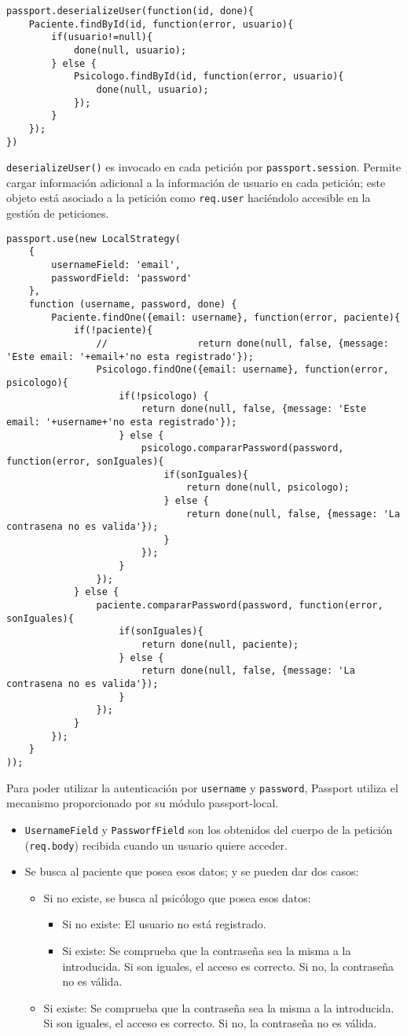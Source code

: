 \medskip
\begin{lstlisting}
passport.deserializeUser(function(id, done){
	Paciente.findById(id, function(error, usuario){
		if(usuario!=null){
			done(null, usuario);
		} else {
			Psicologo.findById(id, function(error, usuario){
				done(null, usuario);
			});
		}
	});
})
\end{lstlisting}

\texttt{deserializeUser()} es invocado en cada petición por \texttt{passport.session}. Permite cargar información adicional a la información de usuario en cada petición; este objeto está asociado a la petición como \texttt{req.user} haciéndolo accesible en la gestión de peticiones.


\medskip
\begin{lstlisting}
passport.use(new LocalStrategy(    
	{
		usernameField: 'email',
		passwordField: 'password'
	},
	function (username, password, done) {   
		Paciente.findOne({email: username}, function(error, paciente){
			if(!paciente){
				//                return done(null, false, {message: 'Este email: '+email+'no esta registrado'});
				Psicologo.findOne({email: username}, function(error, psicologo){
					if(!psicologo) {
						return done(null, false, {message: 'Este email: '+username+'no esta registrado'});
					} else {
						psicologo.compararPassword(password, function(error, sonIguales){
							if(sonIguales){
								return done(null, psicologo);
							} else {
								return done(null, false, {message: 'La contrasena no es valida'});
							}
						});
					}
				});
			} else {
				paciente.compararPassword(password, function(error, sonIguales){
					if(sonIguales){
						return done(null, paciente);
					} else {
						return done(null, false, {message: 'La contrasena no es valida'});
					}
				});
			}
		});
	}
));
\end{lstlisting}


Para poder utilizar la autenticación por \texttt{username}  y \texttt{password}, Passport utiliza el mecanismo proporcionado por su módulo passport-local. 
\begin{itemize}
\item \texttt{UsernameField} y \texttt{PassworfField} son los obtenidos del cuerpo de la petición (\texttt{req.body}) recibida cuando un usuario quiere acceder.
\item Se busca al paciente que posea esos datos; y se pueden dar dos casos:
\begin{itemize}
\item Si no existe, se busca al psicólogo que posea esos datos:
\begin{itemize}
\item Si no existe: El usuario no está registrado.
\item Si existe: Se comprueba que la contraseña sea la misma a la introducida. Si son iguales, el acceso es correcto. Si no, la contraseña no es válida.
\end{itemize}
\item Si existe: Se comprueba que la contraseña sea la misma a la introducida. Si son iguales, el acceso es correcto. Si no, la contraseña no es válida.
\end{itemize}
\end{itemize}


